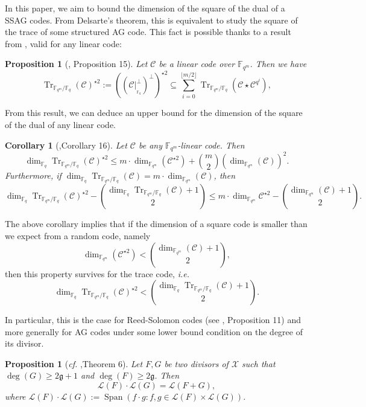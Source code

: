 \documentclass[a4paper]{article}
\newtheorem{proposition}[thm]{Proposition}
\newtheorem{coro}[thm]{Corollary}
\theoremstyle{definition}
\theoremstyle{remark}
\newcommand{\calL}{\mathcal{L}}
\newcommand{\calC}{\mathcal{C}}
\newcommand{\calX}{\mathcal{X}}
\newcommand{\fqm}{\mathbb{F}_{q^m}}
\newcommand{\fq}{\mathbb{F}_{q}}
\newcommand{\Tr}[1]{\operatorname{Tr}_{\mathbb{F}_{q^m}/\fq}\left(#1\right)}
\newcommand{\Span}[1]{\operatorname{Span}\left(#1\right)}
\begin{document}
In this paper, we aim to bound the dimension of the square of the dual of a SSAG codes. From Delsarte's theorem, this is equivalent to study the square of the trace of some structured AG code. 
This fact is possible thanks to a result from \cite{MT21}, valid for any linear code:

\begin{proposition}[\cite{MT21}, Proposition 15] \label{prop:Tr_BoundSchurSquare}
	Let $\calC$ be a linear code over $\fqm$. Then we have 
	\begin{equation} \label{eq:key_equation} \Tr{\calC}^{\star2} := ((\calC|^{\perp}_{_{{\mathbb{F}_q}}})^{\perp})^{\star2} \subseteq \sum\limits_{i=0}^{\lfloor{m/2} \rfloor} \Tr{\calC\star \calC^{q^i}},
	\end{equation}
\end{proposition}

From this result, we can deduce an upper bound for the dimension of the square of the dual of any linear code.

\begin{coro} [\cite{MT21},Corollary 16]\label{coro:first_bound_square_of_trace}
	Let $\calC$ be any $\fqm$-linear code. Then 
	\begin{equation} \label{eq:mumford_bound}
		\dim_{\fq}\Tr{\calC}^{\star2} \leq m \cdot \dim_{\fqm}(\calC^{\star 2}) + \binom{m}{2} (\dim_{\fqm}(\calC))^2.
	\end{equation}
	Furthermore, if $\dim_{\fq} \Tr{\calC} = m \cdot \dim_{\fqm}(\calC)$, then 
	\[\dim_{\fq} \Tr{\calC}^{\star2} - \binom{\dim_{\fq} \Tr{\calC}+1}{2} \leq m \cdot \dim_{\fqm} \calC^{\star 2} - \binom{\dim_{\fqm} (\calC)+1}{2}.\]
\end{coro}

The above corollary implies that if the dimension of a square code is smaller than we expect from a random code, namely
\[ \dim_{\fqm} (\calC^{\star 2}) < \binom{\dim_{\fqm} (\calC)+1}{2},\]
then this property survives for the trace code, \emph{i.e.}
\[\dim_{\fq} \Tr{\calC}^{\star 2} < \binom{\dim_{\fq} \Tr{\calC}+1}{2}.\]

In particular, this is the case for Reed-Solomon codes (see \cite{MT21}, Proposition 11) and more generally for AG codes under some lower bound condition on the degree of its divisor.


\begin{proposition}[\emph{cf.} \cite{Mum70},Theorem 6] \label{prop:mumford_result}
	Let $F,G$ be two divisors of $\calX$ such that $\deg(G) \geq 2\mathfrak{g}+1$ and $\deg(F) \geq 2\mathfrak{g}$. Then
	\[ \calL(F) \cdot \calL(G) = \calL(F+G),\]
	where $\calL(F) \cdot \calL(G) := \Span{ f \cdot g : f,g \in \calL(F) \times \calL(G)}$.
\end{proposition}
\end{document}
